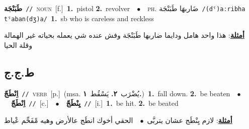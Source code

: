\documentclass[10pt,a4paper,twoside]{article} %
\begin{document}
\begin{multicols}{2}
{\setlength\topsep{0pt}\textbf{\foreignlanguage{arabic}{طَبَنْجَة}}\ {\color{gray}\texttt{//}\color{black}}\ \textsc{noun}\ [f.]\ \textbf{1.}~pistol  \textbf{2.}~revolver\ \ $\bullet$\ \ \textsc{ph.} \color{gray} \foreignlanguage{arabic}{ضَاربهَا طَبَنْجَة}\color{black}\ {\color{gray}\texttt{/{\sffamily (dˤ)aːribha tˤaban(dʒ)a}/}\color{black}}\ \textbf{1.}~sb who is careless and reckless\  \begin{flushright}\color{gray}\foreignlanguage{arabic}{\textbf{\underline{\foreignlanguage{arabic}{أمثلة}}}: هذا واحد هامل ودايما ضاربها طَبَنْجَة وفش عنده شي يعمله بحياته غير الهمالة وقلة الحيا}\end{flushright}\color{black}} \vspace{2mm}

\vspace{-3mm}
\subsection*{\color{blue}\foreignlanguage{arabic}{ط.ج.ج}\color{blue}{}} 

{\setlength\topsep{0pt}\textbf{\foreignlanguage{arabic}{اِنْطَجّ}}\ {\color{gray}\texttt{//}\color{black}}\ \textsc{verb}\ [p.]\ \color{gray}(msa. \foreignlanguage{arabic}{يُضْرَب}~\foreignlanguage{arabic}{\textbf{٢.}}  \foreignlanguage{arabic}{يَسْقُط}~\foreignlanguage{arabic}{\textbf{١.}})\color{black}\ \textbf{1.}~fall down.  \textbf{2.}~be beaten\ \ $\bullet$\ \ \setlength\topsep{0pt}\textbf{\foreignlanguage{arabic}{اِنْطَجّ}}\ {\color{gray}\texttt{//}\color{black}}\ [c.]\ \ $\bullet$\ \ \setlength\topsep{0pt}\textbf{\foreignlanguage{arabic}{يِنْطَجّ}}\ {\color{gray}\texttt{//}\color{black}}\ [i.]\ \textbf{1.}~be hit.  \textbf{2.}~be beated\  \begin{flushright}\color{gray}\foreignlanguage{arabic}{\textbf{\underline{\foreignlanguage{arabic}{أمثلة}}}: لازم يِنْطَج عشان يتربَّى\ $\bullet$\ \  الحقي أخوك انطَج عالأرض وهيه مْفَحِّم عْياط}\end{flushright}\color{black}} \vspace{2mm}


\end{multicols}
\end{document}
